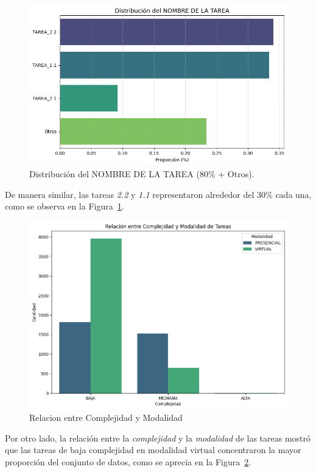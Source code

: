 \documentclass[twocolumn]{article}
\begin{document}
\begin{figure}[H]
    \centering
    \includegraphics[width=\columnwidth]{img/DistribucionNombreTarea.png}
    \caption{Distribución del NOMBRE DE LA TAREA (80\% + Otros).}
    \label{fig:distribucion_nombre_tarea}
\end{figure}

De manera similar, las tareas \textit{2.2} y \textit{1.1} representaron alrededor del 30\% cada una, como se observa en la Figura~\ref{fig:distribucion_nombre_tarea}.

\begin{figure}[H]
    \centering
    \includegraphics[width=\columnwidth]{img/RelacionComplejidadModalidad.png}
    \caption{Relacion entre Complejidad y Modalidad}
    \label{fig:relacion_complejidadymodalidad}
\end{figure}

Por otro lado, la relación entre la \textit{complejidad} y la \textit{modalidad} de las tareas mostró que las tareas de baja complejidad en modalidad virtual concentraron la mayor proporción del conjunto de datos, como se aprecia en la Figura~\ref{fig:relacion_complejidadymodalidad}.
\end{document}
